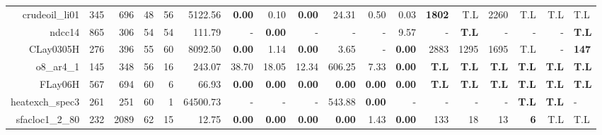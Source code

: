\begin{table*}[t]
\begin{tabular}{|r|r|r|r|r||r||r|r|r|r|r||r|r|r|r|r|r|}
                    crudeoil\_li01 &          345 &           696 &           48 &            56 &             5122.56 &  \textbf{0.00} &           0.10 &  \textbf{0.00} &          24.31 &           0.50 &           0.03 &      \textbf{1802} &                T.L &               2260 &                T.L &          T.L &          T.L \\ 
                            ndcc14 &          865 &           306 &           54 &            54 &              111.79 &              - &  \textbf{0.00} &              - &              - &              - &           9.57 &                  - &       \textbf{T.L} &                  - &                  - &            - & \textbf{T.L} \\ 
                         CLay0305H &          276 &           396 &           55 &            60 &             8092.50 &  \textbf{0.00} &           1.14 &  \textbf{0.00} &           3.65 &              - &  \textbf{0.00} &               2883 &               1295 &               1695 &                T.L &            - & \textbf{147} \\ 
                        o8\_ar4\_1 &          145 &           348 &           56 &            16 &              243.07 &          38.70 &          18.05 &          12.34 &         606.25 &           7.33 &  \textbf{0.00} &       \textbf{T.L} &       \textbf{T.L} &       \textbf{T.L} &       \textbf{T.L} & \textbf{T.L} & \textbf{T.L} \\ 
                           FLay06H &          567 &           694 &           60 &             6 &               66.93 &  \textbf{0.00} &  \textbf{0.00} &  \textbf{0.00} &  \textbf{0.00} &  \textbf{0.00} &  \textbf{0.00} &       \textbf{T.L} &       \textbf{T.L} &       \textbf{T.L} &       \textbf{T.L} & \textbf{T.L} & \textbf{T.L} \\ 
                   heatexch\_spec3 &          261 &           251 &           60 &             1 &            64500.73 &              - &              - &              - &         543.88 &  \textbf{0.00} &              - &                  - &                  - &                  - &       \textbf{T.L} & \textbf{T.L} &            - \\ 
                   sfacloc1\_2\_80 &          232 &          2089 &           62 &            15 &               12.75 &  \textbf{0.00} &  \textbf{0.00} &  \textbf{0.00} &  \textbf{0.00} &           1.43 &  \textbf{0.00} &                133 &                 18 &                 13 &         \textbf{6} &          T.L &          T.L \\ 

\end{tabular}
\end{table*}
